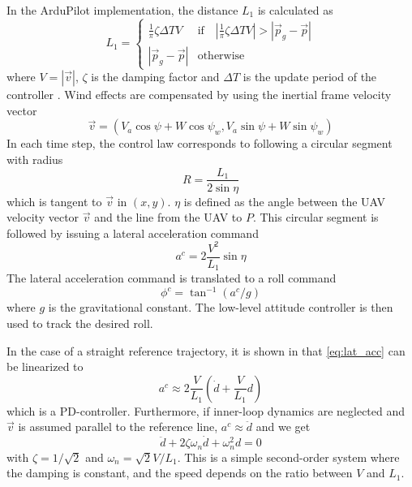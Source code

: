 In the ArduPilot implementation, the distance $L_1$ is calculated as
\begin{equation}\label{eq:ardu_l1}
    L_1=\begin{cases}
        \frac{1}{\pi}\zeta\Delta TV & \mbox{if}\quad |\frac{1}{\pi}\zeta\Delta TV|>|\vec{p}_g-\vec{p}| \\
        |\vec{p}_g-\vec{p}| & \mbox{otherwise}
    \end{cases}
\end{equation}
where $V=|\vec{v}|$, $\zeta$ is the damping factor and $\Delta T$ is the update period of the controller \cite{arduplane_l1}.
Wind effects are compensated by using the inertial frame velocity vector 
\begin{equation}
    \vec{v} = (V_a\cos\psi + W\cos\psi_w, V_a\sin\psi + W\sin\psi_w)
\end{equation}
 In each time step, the control law corresponds to following a circular segment with radius
 \begin{equation}
    R=\frac{L_1}{2\sin\eta}
 \end{equation}
 which is tangent to $\vec{v}$ in $(x,y)$.
 $\eta$ is defined as the angle between the UAV velocity vector $\vec{v}$ and the line from the UAV to $P$.
This circular segment is followed by issuing a lateral acceleration command
\begin{equation}\label{eq:lat_acc}
    a^{c}=2\frac{V^2}{L_1}\sin\eta
\end{equation}
The lateral acceleration command is translated to a roll command
\begin{equation}\label{eq:roll_cmd}
    \phi^{c}=\tan^{-1}(a^{c}/g)
\end{equation}
where $g$ is the gravitational constant. The low-level attitude controller is then used to track the desired roll.

In the case of a straight reference trajectory, it is shown in \cite{l1_controller} that \eqref{eq:lat_acc} 
can be linearized to
\begin{equation}
    a^c\approx2\frac{V}{L_1}\left(\dot{d}+\frac{V}{L_1}d\right)
\end{equation} 
which is a PD-controller. Furthermore, if inner-loop dynamics are neglected and 
$\vec{v}$ is assumed parallel to the reference line, $a^c\approx \ddot{d}$ and we get
\begin{equation}
    \ddot{d} + 2\zeta\omega_n\dot{d} + \omega_n^2d=0
\end{equation}
with $\zeta=1/\sqrt{2}$ and $\omega_n=\sqrt{2}V/L_1$. This is a simple second-order system where 
the damping is constant, and the speed depends on the ratio between $V$ and $L_1$. 
\iffalse
